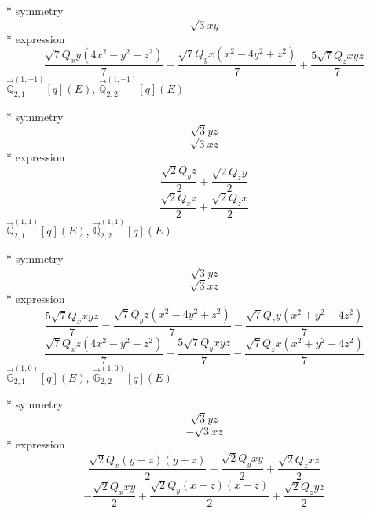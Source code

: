 \documentclass[fleqn,8pt]{jsarticle}
\begin{document}
\noindent\quad ** symmetry
\begin{dmath*}
\sqrt{3} x y
\end{dmath*}
\noindent\quad ** expression
\begin{dmath*}
\frac{\sqrt{7} Q_{x} y \left(4 x^{2} - y^{2} - z^{2}\right)}{7} - \frac{\sqrt{7} Q_{y} x \left(x^{2} - 4 y^{2} + z^{2}\right)}{7} + \frac{5 \sqrt{7} Q_{z} x y z}{7}
\end{dmath*}
\noindent\quad $\vec{\mathbb{Q}}_{2,1}^{(1,-1)}[q](E)$, $\vec{\mathbb{Q}}_{2,2}^{(1,-1)}[q](E)$

\noindent\quad ** symmetry
\begin{dmath*}
\sqrt{3} y z
\end{dmath*}
\begin{dmath*}
\sqrt{3} x z
\end{dmath*}
\noindent\quad ** expression
\begin{dmath*}
\frac{\sqrt{2} Q_{y} z}{2} + \frac{\sqrt{2} Q_{z} y}{2}
\end{dmath*}
\begin{dmath*}
\frac{\sqrt{2} Q_{x} z}{2} + \frac{\sqrt{2} Q_{z} x}{2}
\end{dmath*}
\noindent\quad $\vec{\mathbb{Q}}_{2,1}^{(1,1)}[q](E)$, $\vec{\mathbb{Q}}_{2,2}^{(1,1)}[q](E)$

\noindent\quad ** symmetry
\begin{dmath*}
\sqrt{3} y z
\end{dmath*}
\begin{dmath*}
\sqrt{3} x z
\end{dmath*}
\noindent\quad ** expression
\begin{dmath*}
\frac{5 \sqrt{7} Q_{x} x y z}{7} - \frac{\sqrt{7} Q_{y} z \left(x^{2} - 4 y^{2} + z^{2}\right)}{7} - \frac{\sqrt{7} Q_{z} y \left(x^{2} + y^{2} - 4 z^{2}\right)}{7}
\end{dmath*}
\begin{dmath*}
\frac{\sqrt{7} Q_{x} z \left(4 x^{2} - y^{2} - z^{2}\right)}{7} + \frac{5 \sqrt{7} Q_{y} x y z}{7} - \frac{\sqrt{7} Q_{z} x \left(x^{2} + y^{2} - 4 z^{2}\right)}{7}
\end{dmath*}
\noindent\quad $\vec{\mathbb{G}}_{2,1}^{(1,0)}[q](E)$, $\vec{\mathbb{G}}_{2,2}^{(1,0)}[q](E)$

\noindent\quad ** symmetry
\begin{dmath*}
\sqrt{3} y z
\end{dmath*}
\begin{dmath*}
- \sqrt{3} x z
\end{dmath*}
\noindent\quad ** expression
\begin{dmath*}
\frac{\sqrt{2} Q_{x} \left(y - z\right) \left(y + z\right)}{2} - \frac{\sqrt{2} Q_{y} x y}{2} + \frac{\sqrt{2} Q_{z} x z}{2}
\end{dmath*}
\begin{dmath*}
- \frac{\sqrt{2} Q_{x} x y}{2} + \frac{\sqrt{2} Q_{y} \left(x - z\right) \left(x + z\right)}{2} + \frac{\sqrt{2} Q_{z} y z}{2}
\end{dmath*}
\end{document}

